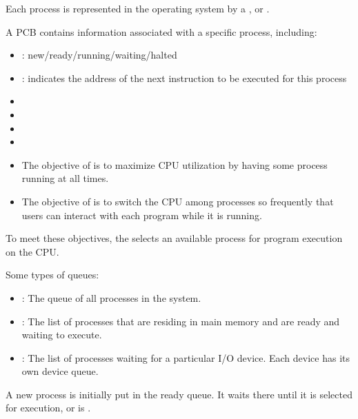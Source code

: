     \par Each process is represented in the operating system by a , or .
    \par A PCB contains information associated with a specific process,
    including:
      \begin{itemize}
        \item {}: new/ready/running/waiting/halted
        \item {}: indicates the address of the next instruction to be executed for this process
        \item {}
        \item {}
        \item {}
        \item {}
      \end{itemize}



    \begin{itemize}
      \item The objective of  is to maximize CPU
        utilization by having some process running at all times.
      \item The objective of  is to switch the CPU among
        processes so frequently that users can interact with each program while
        it is running.
    \end{itemize}
    \par To meet these objectives, the  selects an
      available process for program execution on the CPU.

    \par Some types of queues:
      \begin{itemize}
        \item {}: The queue of all processes in the system.
        \item {}: The list of  processes that are residing in main
          memory and are ready and waiting to execute.
        \item {}: The list of processes waiting for a particular
          I/O device. Each device has its own device queue.
      \end{itemize}
    \par A new process is initially put in the ready queue. It waits there
      until it is selected for execution, or is .

